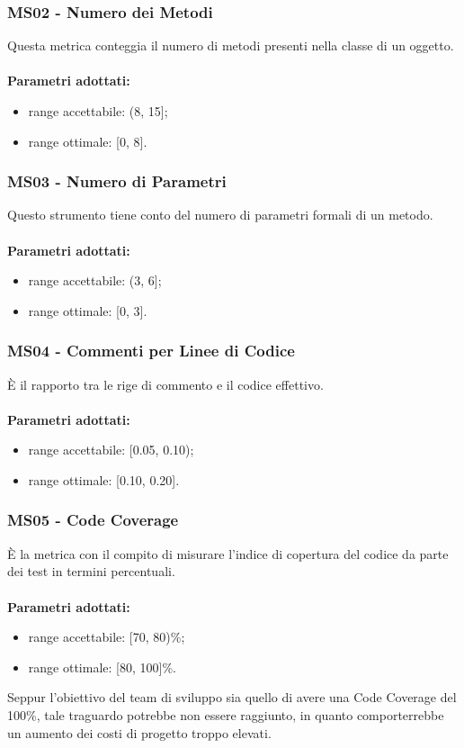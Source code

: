 \subsubsection{MS02 - Numero dei Metodi}
Questa metrica conteggia il numero di metodi presenti nella classe di un oggetto.\\ \\ 
\textbf{Parametri adottati:} 
\begin{itemize}
\item range accettabile: (8, 15];
\item range ottimale: [0, 8].
\end{itemize}
\subsubsection{MS03 - Numero di Parametri}
Questo strumento tiene conto del numero di parametri formali di un metodo.\\ \\ 
\textbf{Parametri adottati:} 
\begin{itemize}
\item range accettabile: (3, 6];
\item range ottimale: [0, 3].
\end{itemize}
\subsubsection{MS04 - Commenti per Linee di Codice}
È il rapporto tra le rige di commento e il codice effettivo.\\ \\ 
\textbf{Parametri adottati:} 
\begin{itemize}
\item range accettabile: [0.05, 0.10);
\item range ottimale: [0.10, 0.20].
\end{itemize}
\subsubsection{MS05 - Code Coverage}
È la metrica con il compito di misurare l'indice di copertura del codice da parte dei test in termini percentuali.\\ \\ 
\textbf{Parametri adottati:} 
\begin{itemize}
\item range accettabile: [70, 80)\%;
\item range ottimale: [80, 100]\%.
\end{itemize}
Seppur l'obiettivo del team di sviluppo sia quello di avere una Code Coverage del 100\%, tale traguardo potrebbe non essere raggiunto, in quanto comporterrebbe un aumento dei costi di progetto troppo elevati.
